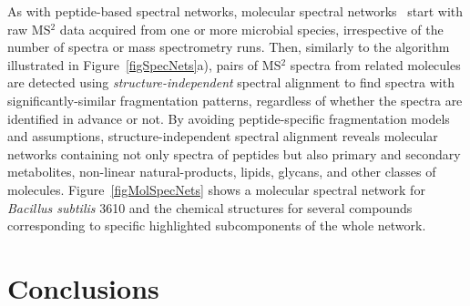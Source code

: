 \documentclass[8.5pt,twoside,twocolumn]{article}
\begin{document}
As with peptide-based spectral networks, molecular spectral networks~\cite{watrous12} start with raw MS$^2$ data acquired from one or more microbial species, irrespective of the number of spectra or mass spectrometry runs. Then, similarly to the algorithm illustrated in \mbox{Figure~\ref{figSpecNets}a)}, pairs of MS$^2$ spectra from related molecules are detected using {\em structure-independent} spectral alignment to find spectra with significantly-similar fragmentation patterns, regardless of whether the spectra are identified in advance or not. By avoiding peptide-specific fragmentation models and assumptions, structure-independent spectral alignment reveals molecular networks containing not only spectra of peptides but also primary and secondary metabolites, non-linear natural-products, lipids, glycans, and other classes of molecules. Figure~\ref{figMolSpecNets} shows a molecular spectral network for {\em Bacillus subtilis} 3610 and the chemical structures for several compounds corresponding to specific highlighted subcomponents of the whole network.

\section{Conclusions}
\end{document}
